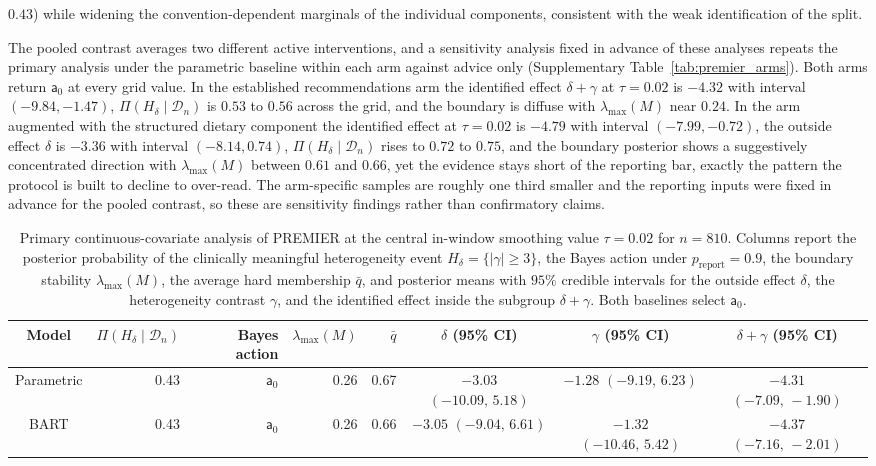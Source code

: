\documentclass[11pt]{article}
\theoremstyle{definition}
\theoremstyle{plain}
\begin{document}
$0.43$) while widening the convention-dependent marginals of the individual components, consistent with the weak identification of the split.

The pooled contrast averages two different active interventions, and a sensitivity analysis fixed in advance of these analyses repeats the primary analysis under the parametric baseline within each arm against advice only (Supplementary Table~\ref{tab:premier_arms}). Both arms return $\mathsf a_0$ at every grid value. In the established recommendations arm the identified effect $\delta+\gamma$ at $\tau=0.02$ is $-4.32$ with interval $(-9.84,-1.47)$, $\Pi(H_\delta\mid\mathcal D_n)$ is $0.53$ to $0.56$ across the grid, and the boundary is diffuse with $\lambda_{\max}(M)$ near $0.24$. In the arm augmented with the structured dietary component the identified effect at $\tau=0.02$ is $-4.79$ with interval $(-7.99,-0.72)$, the outside effect $\delta$ is $-3.36$ with interval $(-8.14,0.74)$, $\Pi(H_\delta\mid\mathcal D_n)$ rises to $0.72$ to $0.75$, and the boundary posterior shows a suggestively concentrated direction with $\lambda_{\max}(M)$ between $0.61$ and $0.66$, yet the evidence stays short of the reporting bar, exactly the pattern the protocol is built to decline to over-read. The arm-specific samples are roughly one third smaller and the reporting inputs were fixed in advance for the pooled contrast, so these are sensitivity findings rather than confirmatory claims.

\begin{table}
  \centering
  \caption{Primary continuous-covariate analysis of PREMIER at the central in-window smoothing value $\tau=0.02$ for $n=810$. Columns report the posterior probability of the clinically meaningful heterogeneity event $H_\delta=\{|\gamma|\ge3\}$, the Bayes action under $p_{\mathrm{report}}=0.9$, the boundary stability $\lambda_{\max}(M)$, the average hard membership $\bar q$, and posterior means with $95\%$ credible intervals for the outside effect $\delta$, the heterogeneity contrast $\gamma$, and the identified effect inside the subgroup $\delta+\gamma$. Both baselines select $\mathsf a_0$.}
  \begin{adjustbox}{width=\textwidth}
  \begin{tabular}{c rrrr ccc}
    \toprule
      \textbf{Model}
      & $\Pi(H_\delta\mid \mathcal D_n)$ & \textup{Bayes action} & $\lambda_{\max}(M)$
      & $\bar{q}$ & $\delta$ (95\% CI) & $\gamma$ (95\% CI)
      & $\delta+\gamma$ (95\% CI)  \\
    \midrule
    Parametric & 0.43 & $\mathsf{a}_0$ & 0.26 & 0.67 & $-3.03$ $(-10.09,\,5.18)$ & $-1.28$ $(-9.19,\,6.23)$ & $-4.31$ $(-7.09,\,-1.90)$  \\
    BART       & 0.43 & $\mathsf{a}_0$ & 0.26 & 0.66 & $-3.05$ $(-9.04,\,6.61)$ & $-1.32$ $(-10.46,\,5.42)$ & $-4.37$ $(-7.16,\,-2.01)$  \\
    \bottomrule
  \end{tabular}
  \end{adjustbox}
  \label{tab:contrast_decision_rule_result}
\end{table}
\end{document}
